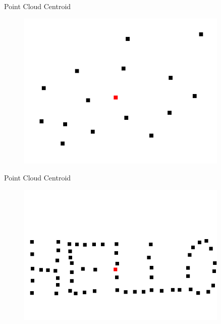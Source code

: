 \documentclass{beamer}
\begin{document}
\begin{frame}{Point Cloud Centroid}

\begin{figure}[t]
    \centering
	\includegraphics[width=0.9\textwidth]{Centroid1.png}
\end{figure}

\end{frame}


\begin{frame}{Point Cloud Centroid}

\begin{figure}[t]
    \centering
	\includegraphics[width=0.9\textwidth]{Centroid2.png}
\end{figure}

\end{frame}
\end{document}
